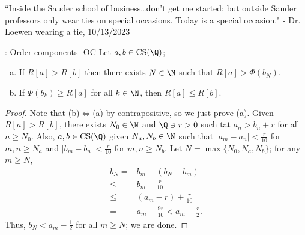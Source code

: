 \begin{nquote}{}
	``Inside the Sauder school of business\dots don't get me started; but outside Sauder professors only wear ties on special occasions. Today is a special occasion." - Dr. Loewen wearing a tie, 10/13/2023
\end{nquote}

\begin{nproposition}{: Order components- OC}
	Let \(a,b\in\operatorname{CS}(\Q)\);
	\begin{enumerate}[(a)]
		\item If \(R[a]>R[b]\) then there exists \(N\in\N\) such that \(R[a]>\Phi(b_{N})\).
		
		\item If \(\Phi(b_k)\geq R[a]\) for all \(k\in\N\), then \(R[a]\leq R[b]\).
	\end{enumerate}
\end{nproposition}
\begin{proof}
	Note that (b)\(\iff\)(a) by contrapositive, so we just prove (a). Given \(R[a]>R[b]\), there exists \(N_0\in\N\) and \(\Q\ni r>0\) such tat \(a_n>b_n+r\) for all \(n\geq N_0\). Also, \(a,b\in\operatorname{CS}(\Q)\) given \(N_a,N_b\in\N\) such that \(|a_m-a_n|<\displaystyle\frac{r}{10}\) for \(m,n\geq N_a\) and \(|b_m-b_n|<\displaystyle\frac{r}{10}\) for \(m,n\geq N_b\). Let \(N=\operatorname{max}\{N_0,N_a,N_b\}\); for any \(m\geq N\),
	\begin{align*}
		b_N=&b_m+(b_N-b_m)\\
		\leq&b_m+\frac{r}{10}\\
		\leq&(a_m-r)+\frac{r}{10}\\
		=&a_m-\frac{9r}{10}<a_m-\frac{r}{2}.
	\end{align*}
	Thus, \(b_N<a_m-\displaystyle\frac{1}{2}\) for all \(m\geq N\); we are done.
\end{proof}

